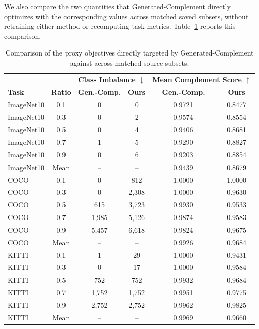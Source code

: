 We also compare the two quantities that Generated-Complement directly optimizes with the corresponding \model values across matched saved subsets, without retraining either method or recomputing task metrics. Table~\ref{tab:generated-complement-proxy-comparison} reports this comparison.

\begin{table}[t]
\centering
\caption{Comparison of the proxy objectives directly targeted by Generated-Complement against \model across matched source subsets.}
\label{tab:generated-complement-proxy-comparison}
\footnotesize
\setlength{\tabcolsep}{4pt}
\begin{tabular}{l c c c c c}
\toprule
\rowcolor{sectiongray} & & \multicolumn{2}{c}{\textbf{Class Imbalance} $\downarrow$} & \multicolumn{2}{c}{\textbf{Mean Complement Score} $\uparrow$} \\
\rowcolor{sectiongray} \textbf{Task} & \textbf{Ratio} & \textbf{Gen.-Comp.} & \textbf{Ours} & \textbf{Gen.-Comp.} & \textbf{Ours} \\
\midrule
ImageNet10 & 0.1 & 0 & 0 & 0.9721 & 0.8477 \\
ImageNet10 & 0.3 & 0 & 2 & 0.9574 & 0.8554 \\
ImageNet10 & 0.5 & 0 & 4 & 0.9406 & 0.8681 \\
ImageNet10 & 0.7 & 1 & 5 & 0.9290 & 0.8827 \\
ImageNet10 & 0.9 & 0 & 6 & 0.9203 & 0.8854 \\
ImageNet10 & Mean & -- & -- & 0.9439 & 0.8679 \\
\midrule
COCO & 0.1 & 0 & 812 & 1.0000 & 1.0000 \\
COCO & 0.3 & 0 & 2,308 & 1.0000 & 0.9630 \\
COCO & 0.5 & 615 & 3,723 & 0.9930 & 0.9533 \\
COCO & 0.7 & 1,985 & 5,126 & 0.9874 & 0.9583 \\
COCO & 0.9 & 5,457 & 6,618 & 0.9824 & 0.9675 \\
COCO & Mean & -- & -- & 0.9926 & 0.9684 \\
\midrule
KITTI & 0.1 & 1 & 29 & 1.0000 & 0.9431 \\
KITTI & 0.3 & 0 & 17 & 1.0000 & 0.9584 \\
KITTI & 0.5 & 752 & 752 & 0.9932 & 0.9684 \\
KITTI & 0.7 & 1,752 & 1,752 & 0.9951 & 0.9775 \\
KITTI & 0.9 & 2,752 & 2,752 & 0.9962 & 0.9825 \\
KITTI & Mean & -- & -- & 0.9969 & 0.9660 \\
\bottomrule
\end{tabular}
\end{table}


